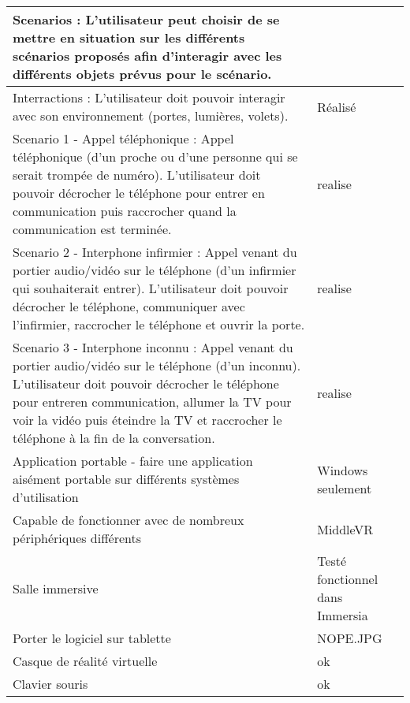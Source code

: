 \begin{tabular}{|p{12cm}|l|}
	Scenarios :  L'utilisateur peut choisir de se mettre en situation sur les différents scénarios proposés afin d'interagir avec les différents objets prévus pour le scénario.\\ \hline
	Interractions : L'utilisateur doit pouvoir interagir avec son environnement (portes, lumières, volets). & Réalisé \\ \hline
	Scenario 1 - Appel téléphonique : Appel téléphonique (d'un proche ou d'une personne qui se serait trompée de numéro). L'utilisateur doit pouvoir décrocher le téléphone pour entrer en communication puis raccrocher quand la communication est terminée. & realise \\ \hline
	Scenario 2 - Interphone infirmier : Appel venant du portier audio/vidéo sur le téléphone (d'un infirmier qui souhaiterait entrer). L'utilisateur doit pouvoir décrocher le téléphone, communiquer avec l'infirmier, raccrocher le téléphone et ouvrir la porte.& realise \\ \hline
	Scenario 3 - Interphone inconnu : Appel venant du portier audio/vidéo sur le téléphone (d'un inconnu). L'utilisateur doit pouvoir décrocher le téléphone pour entreren communication, allumer la TV pour voir la vidéo puis éteindre la TV et raccrocher le téléphone à la fin de la conversation.& realise \\ \hline
	
	Application portable - faire une application aisément portable sur différents systèmes d'utilisation & Windows seulement \\ \hline
	Capable de fonctionner avec de nombreux périphériques différents & MiddleVR \\ \hline
	Salle immersive & Testé fonctionnel dans Immersia \\ \hline
	Porter le logiciel sur tablette  & NOPE.JPG \\ \hline
	Casque de réalité virtuelle & ok \\ \hline
	Clavier souris & ok \\ \hline
	
\end{tabular}
